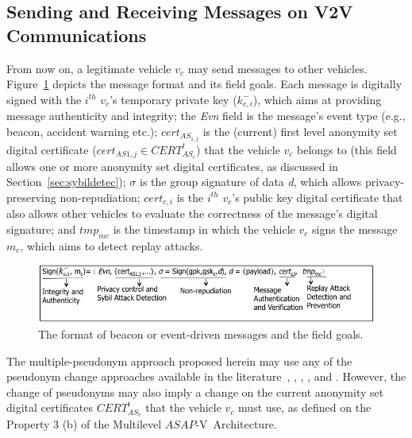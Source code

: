 \documentclass[preprint,12pt]{elsarticle}
\newcommand{\protocolname}{$ASAP$-V}
\begin{document}
\subsection{Sending and Receiving Messages on V2V Communications}
\label{sec:sendingandreceiving}

From now on, a legitimate vehicle $v_{c}$ may send messages to other vehicles. Figure~\ref{fig:msg-format} depicts the message format and its field goals. Each message is digitally signed with the $i^{th}$ $v_{c}$'s temporary private key ($k^{-}_{c,i}$), which aims at providing message authenticity and integrity; the \textit{Evn} field is the message's event type (e.g., beacon, accident warning etc.); $cert_{AS_{1,j}}$ is the (current) first level anonymity set digital certificate ($cert_{AS{1,j}} \in CERT^{t}_{AS_{c}}$) that the vehicle $v_{c}$ belongs to (this field allows one or more anonymity set digital certificates, as discussed in Section~\ref{sec:sybildetec}); $\sigma$ is the group signature of data \textit{d}, which allows privacy-preserving non-repudiation; $cert_{c, i}$ is the $i^{th}$ $v_{c}$'s public key digital certificate that also allows other vehicles to evaluate the correctness of the message's digital signature; and $tmp_{mc}$ is the timestamp in which the vehicle $v_{c}$ signs the message $m_c$, which aims to detect replay attacks.

\begin{figure}[ht]
\centering
\includegraphics[scale=.43]{figures/message-format.jpg}
\caption{The format of beacon or event-driven messages and the field goals.}
\label{fig:msg-format}
\end{figure}

The multiple-pseudonym approach proposed herein may use any of the pseudonym change approaches available in the literature~\cite{lu2012pseudonym}, \cite{mix-zone-vanets}, \cite{buttyan2007effectiveness}, \cite{caravan}, \cite{buttyan2009slow} and \cite{mix-zone-motion}. However, the change of pseudonyms may also imply a change on the current anonymity set digital certificates $CERT^{t}_{AS_{c}}$ that the vehicle $v_{c}$ must use, as defined on the Property 3 (b) of the Multilevel \protocolname~Architecture.
\end{document}
